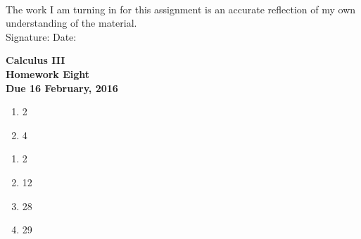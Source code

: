 \documentclass[12pt]{article}
\begin{document}
\\

\bigskip
\bigskip
\bigskip
\bigskip
\bigskip
\bigskip
\noindent The work I am turning in for this assignment is an accurate
reflection of my own understanding of the material.\\[14pt]

\noindent Signature: \underline{\hspace{7cm}} \hspace{1cm} Date:
\underline{\hspace{5cm}} 


\pagestyle{empty}
 
\begin{center}
{\large {\bf Calculus III}}\\
\medskip
{\large {\bf Homework Eight}}\\
\medskip
{ {\bf Due 16 February, 2016}}\\
\end{center}




\bigskip
{}
\begin{enumerate}
\setlength{\itemsep}{-1mm}
  \item 2
  \item 4
\end{enumerate}





\begin{enumerate}
\setlength{\itemsep}{-1mm}
  \item 2
  \item 12
  \item 28
  \item 29
\end{enumerate}
\end{document}
